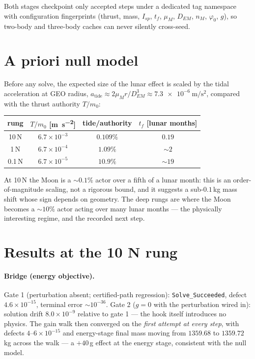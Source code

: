 \documentclass[11pt]{article}
\begin{document}
Both stages checkpoint only accepted steps under a dedicated tag namespace
with configuration fingerprints (thrust, mass, $I_{sp}$, $t_f$, $\mu_M$,
$D_{EM}$, $n_M$, $\varphi_0$, $g$), so two-body and three-body caches can
never silently cross-seed.

\section{A priori null model}

Before any solve, the expected size of the lunar effect is scaled by the
tidal acceleration at GEO radius,
$a_{\text{tide}} \approx 2\mu_M r / D_{EM}^3 \approx
\SI{7.3e-6}{\meter\per\second\squared}$, compared with the thrust
authority $T/m_0$:

\begin{center}
\begin{tabular}{cccc}
\toprule
rung & $T/m_0$ [\si{\meter\per\second\squared}] & tide/authority & $t_f$ [lunar months]\\
\midrule
10\,N  & $6.7\times 10^{-3}$ & $0.109\%$ & $0.19$\\
1\,N   & $6.7\times 10^{-4}$ & $1.09\%$  & $\sim 2$\\
0.1\,N & $6.7\times 10^{-5}$ & $10.9\%$  & $\sim 19$\\
\bottomrule
\end{tabular}
\end{center}

\noindent
At 10\,N the Moon is a $\sim 0.1\%$ actor over a fifth of a lunar month:
this is an order-of-magnitude scaling, not a rigorous bound, and it
suggests a sub-$0.1$\,kg mass shift whose sign depends on geometry. The
deep rungs are where the Moon becomes a $\sim 10\%$ actor
acting over many lunar months --- the physically interesting regime, and
the recorded next step.

\section{Results at the 10 N rung}

\paragraph{Bridge (energy objective).}
Gate 1 (perturbation absent; certified-path regression):
\texttt{Solve\_Succeeded}, defect $4.6\times 10^{-15}$, terminal error
$\sim 10^{-36}$. Gate 2 ($g = 0$ with the perturbation wired in): solution
drift $8.0\times 10^{-9}$ relative to gate 1 --- the hook itself introduces
no physics. The gain walk then converged on the \emph{first attempt at
every step}, with defects $4$--$6\times 10^{-15}$ and energy-stage final
mass moving from $1359.68$ to $1359.72$\,kg across the walk --- a
$+40$\,g effect at the energy stage, consistent with the null model.
\end{document}
